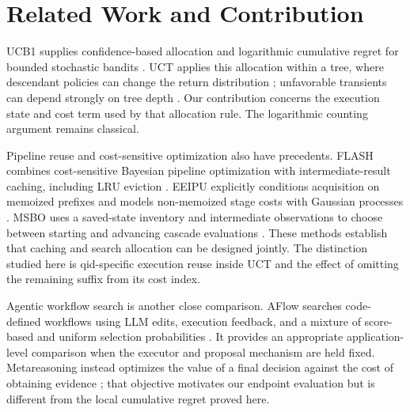 \section{Related Work and Contribution}
UCB1 supplies confidence-based allocation and logarithmic cumulative regret for bounded stochastic bandits \citep{auer2002finite}. UCT applies this allocation within a tree, where descendant policies can change the return distribution \citep{kocsis2006bandit}; unfavorable transients can depend strongly on tree depth \citep{coquelin2007bandit}. Our contribution concerns the execution state and cost term used by that allocation rule. The logarithmic counting argument remains classical.

Pipeline reuse and cost-sensitive optimization also have precedents. FLASH combines cost-sensitive Bayesian pipeline optimization with intermediate-result caching, including LRU eviction \citep{zhang2016flash}. EEIPU explicitly conditions acquisition on memoized prefixes and models non-memoized stage costs with Gaussian processes \citep{essofi2024memoization}. MSBO uses a saved-state inventory and intermediate observations to choose between starting and advancing cascade evaluations \citep{torresi2026multistage}. These methods establish that caching and search allocation can be designed jointly. The distinction studied here is qid-specific execution reuse inside UCT and the effect of omitting the remaining suffix from its cost index.

Agentic workflow search is another close comparison. AFlow searches code-defined workflows using LLM edits, execution feedback, and a mixture of score-based and uniform selection probabilities \citep{zhang2024aflow}. It provides an appropriate application-level comparison when the executor and proposal mechanism are held fixed. Metareasoning instead optimizes the value of a final decision against the cost of obtaining evidence \citep{hay2012selecting}; that objective motivates our endpoint evaluation but is different from the local cumulative regret proved here.


